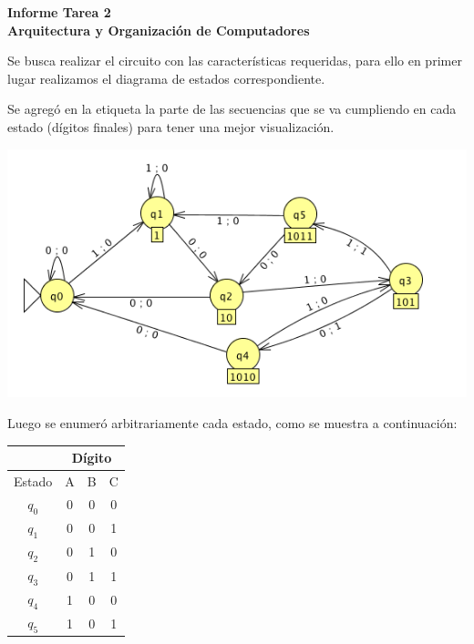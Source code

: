 \documentclass[11pt,letterpaper]{article}
\newcommand{\titulo}{Informe Tarea 2 \\ Arquitectura y Organización de Computadores}
\renewcommand{\maketitle}
{
\thispagestyle{fancy}
\begin{center}
\begin{Large}
\textbf{\titulo}\\
\end{Large}
\end{center}
\vspace{0.3cm}
}
\begin{document}
\setcounter{secnumdepth}{0}
\maketitle
Se busca realizar el circuito con las características requeridas, para ello en primer lugar realizamos el diagrama de estados correspondiente.

Se agregó en la etiqueta la parte de las secuencias que se va cumpliendo en cada estado (dígitos finales) para tener una mejor visualización.
\begin{center}
\includegraphics[width=15cm]{diag-estados.png}
\end{center}

Luego se enumeró arbitrariamente cada estado, como se muestra a continuación:
\vspace{0.2cm}
\begin{table}[h]
\centering
\begin{tabular}{c|c|c|c|}
\cline{2-4}
                             & \multicolumn{3}{c|}{Dígito} \\ \hline
\multicolumn{1}{|c|}{Estado} & A       & B       & C       \\ \hline
\multicolumn{1}{|c|}{$q_0$}     & 0       & 0       & 0       \\ \hline
\multicolumn{1}{|c|}{$q_1$}     & 0       & 0       & 1       \\ \hline
\multicolumn{1}{|c|}{$q_2$}     & 0       & 1       & 0       \\ \hline
\multicolumn{1}{|c|}{$q_3$}     & 0       & 1       & 1       \\ \hline
\multicolumn{1}{|c|}{$q_4$}     & 1       & 0       & 0       \\ \hline
\multicolumn{1}{|c|}{$q_5$}     & 1       & 0       & 1       \\ \hline
\end{tabular}
\end{table}
\end{document}
